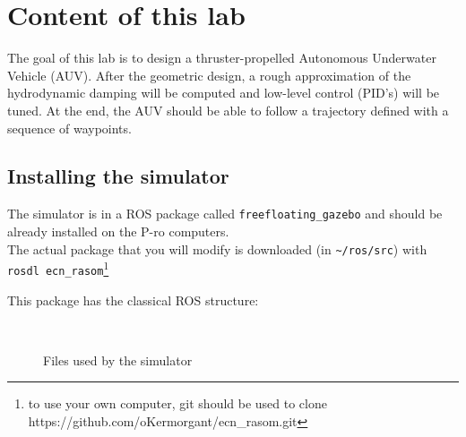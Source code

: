 \documentclass{ecnreport}
\begin{document}


\section{Content of this lab}

The goal of this lab is to design a thruster-propelled Autonomous Underwater Vehicle (AUV). After the geometric design, a rough approximation of the hydrodynamic damping will be computed
and low-level control (PID's) will be tuned. At the end, the AUV should be able to follow a trajectory defined with a sequence of waypoints.

\subsection{Installing the simulator}

The simulator is in a ROS package called \texttt{freefloating\_gazebo} and should be already installed on the P-ro computers.\\
The actual package that you will modify is downloaded (in \texttt{\~{}/ros/src}) with \texttt{rosdl ecn\_rasom}\footnote{to use your own computer, git should be used to clone https://github.com/oKermorgant/ecn\_rasom.git}

This package has the classical ROS structure:
\begin{figure}[h]
\begin{minipage}{.25\linewidth} ~ \end{minipage}
\begin{minipage}{.5\linewidth}
\end{minipage}
\caption{Files used by the simulator}
\end{figure}

%
\end{document}
